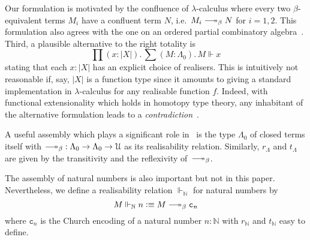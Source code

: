 \documentclass[a4paper,UKenglish,numberwithinsect,cleveref,thm-restate]{lipics-v2021}
\newcommand{\Nat}{\mathbb{N}}
\newcommand{\defeq}{\vcentcolon\equiv}
\newcommand{\Univ}{\mathcal{U}}
\DeclareRobustCommand\longtwoheadrightarrow{\relbar\joinrel\twoheadrightarrow}
\newcommand{\reduce}{\longtwoheadrightarrow_{\beta}}
\theoremstyle{plain}
\begin{document}
Our formulation is motivated by the confluence of $\lambda$-calculus where every two $\beta$-equivalent terms $M_i$ have a confluent term $N$, i.e.\ $M_i \reduce N$ for $i = 1, 2$.
This formulation also agrees with the one on an ordered partial combinatory algebra~\cite[Section~2.3]{Hofstra2003}.
Third, a plausible alternative to the right totality is
\[
  \prod (x : |X|).\, \sum (M : \Lambda_0).\, M \Vdash x
\]
stating that each $x : |X|$ has an explicit choice of realisers.
This is intuitively not reasonable if, say, $|X|$ is a function type since it amounts to giving a standard implementation in $\lambda$-calculus for any realisable function $f$.
Indeed, with functional extensionality which holds in homotopy type theory, any inhabitant of the alternative formulation leads to a \emph{contradiction}~\cite{Troelstra1977}. 

\begin{example}\label{ex:assembly-lambda}
  A useful assembly which plays a significant role in~ is the type $\Lambda_0$ of closed terms itself with ${\reduce} : \Lambda_0 \to \Lambda_0 \to \Univ$ as its realisability relation.
  Similarly, $r_\Lambda$ and $t_\Lambda$ are given by the transitivity and the reflexivity of~$\reduce$.
  
\end{example}

\begin{example}
  The assembly of natural numbers is also important but not in this paper.
  Nevertheless, we define a realisability relation $\Vdash_{\Nat}$ for natural numbers by
  \[
    M \Vdash_\Nat n \defeq M \reduce \mathtt{c}_n
  \]
  where $\mathtt{c}_n$ is the Church encoding of a natural number $n : \Nat$ with $r_\Nat$ and $t_\Nat$ easy to define. 
\end{example}
\end{document}
